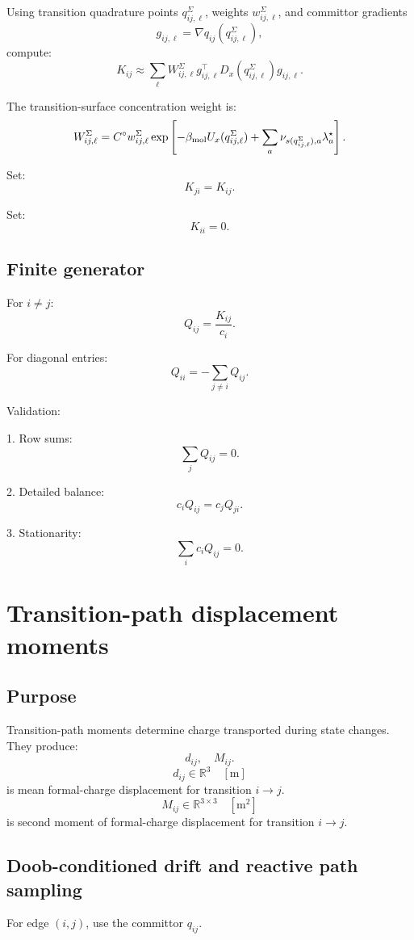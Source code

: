\documentclass[11pt]{article}
\newcommand{\R}{\mathbb R}
\begin{document}
Using transition quadrature points \(q_{ij,\ell}^{\Sigma}\), weights
\(w_{ij,\ell}^{\Sigma}\), and committor gradients
\[
g_{ij,\ell}=\nabla q_{ij}(q_{ij,\ell}^{\Sigma}),
\]
compute:
\[
K_{ij}
\approx
\sum_{\ell}
W_{ij,\ell}^{\Sigma}
g_{ij,\ell}^{\top}
D_x(q_{ij,\ell}^{\Sigma})
g_{ij,\ell}.
\]

The transition-surface concentration weight is:
\[
W_{ij,\ell}^{\Sigma}
=
C^\circ
w_{ij,\ell}^{\Sigma}
\exp
\left[
-\beta_{\rm mol}U_x(q_{ij,\ell}^{\Sigma})
+
\sum_a\nu_{s(q_{ij,\ell}^{\Sigma}),a}\lambda_a^\star
\right].
\]

Set:
\[
K_{ji}=K_{ij}.
\]

Set:
\[
K_{ii}=0.
\]

\subsection{Finite generator}

For \(i\ne j\):
\[
Q_{ij}=\frac{K_{ij}}{c_i}.
\]

For diagonal entries:
\[
Q_{ii}=-\sum_{j\ne i}Q_{ij}.
\]

Validation:

1. Row sums:
\[
\sum_j Q_{ij}=0.
\]

2. Detailed balance:
\[
c_iQ_{ij}=c_jQ_{ji}.
\]

3. Stationarity:
\[
\sum_i c_iQ_{ij}=0.
\]

\section{Transition-path displacement moments}
\label{sec:tpmoments}

\subsection{Purpose}

Transition-path moments determine charge transported during state changes.
They produce:
\[
d_{ij},\quad M_{ij}.
\]
\[
d_{ij}\in\R^3
\quad [\mathrm{m}]
\]
is mean formal-charge displacement for transition \(i\to j\).
\[
M_{ij}\in\R^{3\times3}
\quad [\mathrm{m^2}]
\]
is second moment of formal-charge displacement for transition \(i\to j\).

\subsection{Doob-conditioned drift and reactive path sampling}

For edge \((i,j)\), use the committor \(q_{ij}\).
\end{document}
